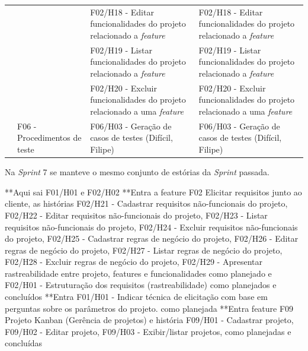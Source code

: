 \begin{table}[!htb]
\begin{tabular}{|M{1.8cm}|M{2.7cm}|M{5.8cm}|M{5.8cm}|}
\\ 
 &  & F02/H18 - Editar funcionalidades do projeto relacionado a \textit{feature} & F02/H18 - Editar funcionalidades do projeto relacionado a \textit{feature}
\\ 
 &  & F02/H19 - Listar funcionalidades do projeto relacionado a \textit{feature} & F02/H19 - Listar funcionalidades do projeto relacionado a \textit{feature}
\\ 
 &  & F02/H20 - Excluir funcionalidades do projeto relacionado a uma \textit{feature} & F02/H20 - Excluir funcionalidades do projeto relacionado a uma \textit{feature}
\\ 
 & F06 - Procedimentos de teste & F06/H03 - Geração de casos de testes (Difícil, Filipe) & F06/H03 - Geração de casos de testes (Difícil, Filipe)
\\ \hline
\end{tabular}
\end{table}

Na \textit{Sprint} 7 se manteve o mesmo conjunto de estórias da \textit{Sprint} passada. \clearpage

**Aqui sai F01/H01 e F02/H02
**Entra a feature F02 Elicitar requisitos junto ao cliente, as histórias F02/H21 - Cadastrar requisitos não-funcionais do projeto, F02/H22 - Editar requisitos não-funcionais do projeto, F02/H23 - Listar requisitos não-funcionais do projeto, F02/H24 - Excluir requisitos não-funcionais do projeto, F02/H25 - Cadastrar regras de negócio do projeto, F02/H26 - Editar regras de negócio do projeto, F02/H27 - Listar regras de negócio do projeto, F02/H28 - Excluir regras de negócio do projeto, F02/H29 - Apresentar rastreabilidade entre projeto, features e funcionalidades como planejado e F02/H01 - Estruturação dos requisitos (rastreabilidade) como planejados e concluídos
**Entra F01/H01 - Indicar técnica de elicitação com base em perguntas sobre os parâmetros do projeto. como planejada
**Entra feature F09 Projeto Kanban (Gerência de projetos) e história F09/H01 - Cadastrar projeto, F09/H02 - Editar projeto, F09/H03 - Exibir/listar projetos, como planejadas e concluídas

